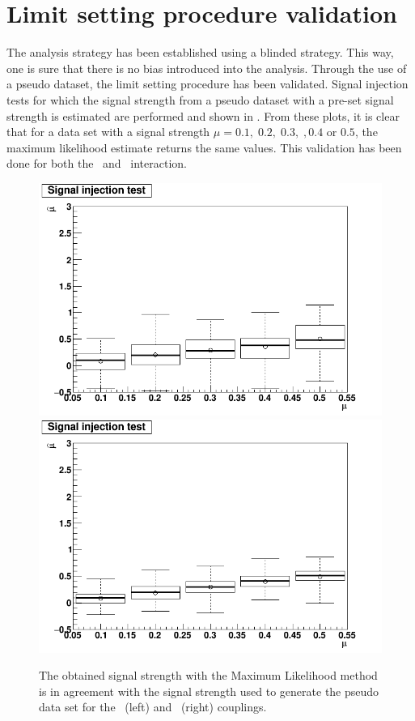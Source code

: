 \clearpage
\section{Limit setting procedure validation}
\label{sec:val}
The analysis strategy has been established using a blinded strategy. This way, one is sure that there is no bias introduced into the analysis. Through the use of a pseudo dataset, the limit setting procedure has been validated. Signal injection tests for which the signal strength from a pseudo dataset with a pre-set  signal strength is estimated are performed and shown in . From these plots, it is clear that for a data set with a signal strength $\mu= 0.1,\;0.2,\;0.3,\;,0.4$ or $0.5$, the maximum likelihood estimate returns the same values. This validation has been done for both the \Zut\ and \Zct\ interaction.
\begin{figure}[htbp]
	\centering
	 \includegraphics[width=0.49\linewidth]{6_Search/Figures/SignalInjection/plotZut}
	 \includegraphics[width=0.49\linewidth]{6_Search/Figures/SignalInjection/plotZct}
	\caption{The  obtained signal strength with the Maximum Likelihood method is in agreement with the signal strength used to generate the pseudo data set for the \Zut\ (left) and \Zct\ (right) couplings.}
	\label{fig:plotzut}
\end{figure}

